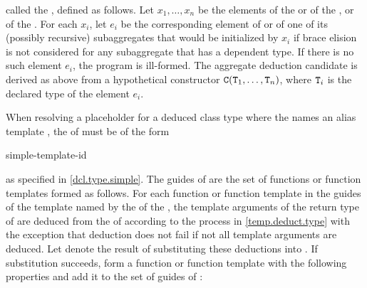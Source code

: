 called the , defined as follows.
Let $x_1, \dotsc, x_n$ be the elements
of the  or
of the , or
of the .
For each $x_i$, let $e_i$ be the corresponding element
of  or of one of its (possibly recursive) subaggregates
that would be initialized by $x_i$
if brace elision is not considered for any subaggregate
that has a dependent type.
If there is no such element $e_i$, the program is ill-formed.
The aggregate deduction candidate is derived as above
from a hypothetical constructor $\texttt{C}(\texttt{T}_1, \dotsc, \texttt{T}_n)$,
where $\texttt{T}_i$ is the declared type of the element $e_i$.

\pnum
When resolving a placeholder for a deduced class type
where the  names an alias template ,
the  of  must be of the form
\begin{ncsimplebnf}
   simple-template-id
\end{ncsimplebnf}
as specified in \ref{dcl.type.simple}.
The guides of  are the set of functions or function templates
formed as follows.
For each function or function template  in the guides of
the template named by the 
of the ,
the template arguments of the return type of 
are deduced
from the  of 
according to the process in \ref{temp.deduct.type}
with the exception that deduction does not fail
if not all template arguments are deduced.
Let  denote the result of substituting
these deductions into .
If substitution succeeds,
form a function or function template 
with the following properties and add it to the set
of guides of :
